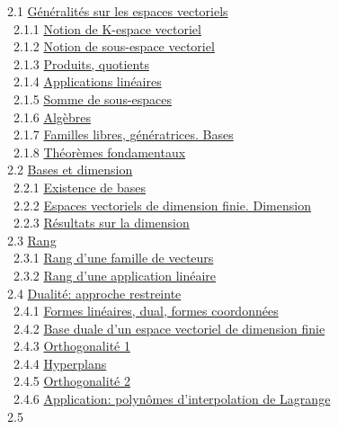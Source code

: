 \documentclass[]{article}
\begin{document}
~2.1 \href{coursse7.html\#x12-520002.1}{Généralités sur les espaces
vectoriels} \\ ~~2.1.1 \href{coursse7.html\#x12-530002.1.1}{Notion de
K-espace vectoriel} \\ ~~2.1.2
\href{coursse7.html\#x12-540002.1.2}{Notion de sous-espace vectoriel} \\
~~2.1.3 \href{coursse7.html\#x12-550002.1.3}{Produits, quotients} \\
~~2.1.4 \href{coursse7.html\#x12-560002.1.4}{Applications linéaires} \\
~~2.1.5 \href{coursse7.html\#x12-570002.1.5}{Somme de sous-espaces} \\
~~2.1.6 \href{coursse7.html\#x12-580002.1.6}{Algèbres} \\ ~~2.1.7
\href{coursse7.html\#x12-590002.1.7}{Familles libres, génératrices.
Bases} \\ ~~2.1.8 \href{coursse7.html\#x12-600002.1.8}{Théorèmes
fondamentaux} \\ ~2.2 \href{coursse8.html\#x13-610002.2}{Bases et
dimension} \\ ~~2.2.1 \href{coursse8.html\#x13-620002.2.1}{Existence de
bases} \\ ~~2.2.2 \href{coursse8.html\#x13-630002.2.2}{Espaces
vectoriels de dimension finie. Dimension} \\ ~~2.2.3
\href{coursse8.html\#x13-640002.2.3}{Résultats sur la dimension} \\ ~2.3
\href{coursse9.html\#x14-650002.3}{Rang} \\ ~~2.3.1
\href{coursse9.html\#x14-660002.3.1}{Rang d'une famille de vecteurs} \\
~~2.3.2 \href{coursse9.html\#x14-670002.3.2}{Rang d'une application
linéaire} \\ ~2.4 \href{coursse10.html\#x15-680002.4}{Dualité: approche
restreinte} \\ ~~2.4.1 \href{coursse10.html\#x15-690002.4.1}{Formes
linéaires, dual, formes coordonnées} \\ ~~2.4.2
\href{coursse10.html\#x15-700002.4.2}{Base duale d'un espace vectoriel
de dimension finie} \\ ~~2.4.3
\href{coursse10.html\#x15-710002.4.3}{Orthogonalité 1} \\ ~~2.4.4
\href{coursse10.html\#x15-720002.4.4}{Hyperplans} \\ ~~2.4.5
\href{coursse10.html\#x15-730002.4.5}{Orthogonalité 2} \\ ~~2.4.6
\href{coursse10.html\#x15-740002.4.6}{Application: polynômes
d'interpolation de Lagrange} \\ ~2.5
\end{document}
